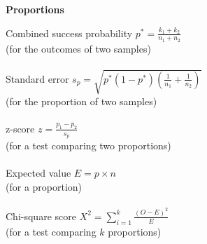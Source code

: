\hfill\vline\hfill
\begin{minipage}[t]{.45\textwidth}
\begin{center}
    \textbf{Proportions}
\end{center}
\hline
\answerskip
Combined success probability \hfill $p^* = \frac{k_1 + k_2}{n_1 + n_2}$ \\
{\scriptsize (for the outcomes of two samples)} \\
\\
Standard error \hfill $s_p = \sqrt{p^*(1 - p^*) (\frac{1}{n_1} + \frac{1}{n_2})}$ \\
{\scriptsize (for the proportion of two samples)} \\
\\
z-score \hfill $z = \frac{p_1 - p_2}{s_p}$ \\
{\scriptsize (for a test comparing two proportions)} \\
\\
Expected value \hfill $E = p \times n$ \\
{\scriptsize (for a proportion)} \\
\\
Chi-square score \hfill $X^2 = \sum_{i=1}^k \frac{(O - E)^2}{E}$ \\
{\scriptsize (for a test comparing $k$ proportions)} \\
\\
\end{minipage}

\clearpage %